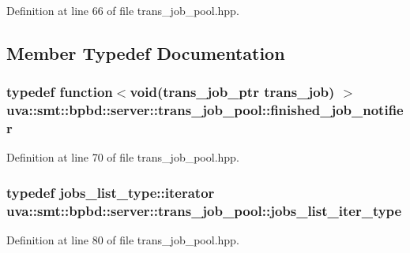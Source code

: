 Definition at line 66 of file trans\+\_\+job\+\_\+pool.\+hpp.



\subsection{Member Typedef Documentation}
\hypertarget{classuva_1_1smt_1_1bpbd_1_1server_1_1trans__job__pool_a6a18b765d5a321e2bcc7e3be3213c06e}{}
\subsubsection[{finished\+\_\+job\+\_\+notifier}]{\setlength{\rightskip}{0pt plus 5cm}typedef function$<$void({\bf trans\+\_\+job\+\_\+ptr} {\bf trans\+\_\+job}) $>$ {\bf uva\+::smt\+::bpbd\+::server\+::trans\+\_\+job\+\_\+pool\+::finished\+\_\+job\+\_\+notifier}}\label{classuva_1_1smt_1_1bpbd_1_1server_1_1trans__job__pool_a6a18b765d5a321e2bcc7e3be3213c06e}


Definition at line 70 of file trans\+\_\+job\+\_\+pool.\+hpp.

\hypertarget{classuva_1_1smt_1_1bpbd_1_1server_1_1trans__job__pool_a425f33ff0864b19e0ba351c17036d823}{}
\subsubsection[{jobs\+\_\+list\+\_\+iter\+\_\+type}]{\setlength{\rightskip}{0pt plus 5cm}typedef jobs\+\_\+list\+\_\+type\+::iterator {\bf uva\+::smt\+::bpbd\+::server\+::trans\+\_\+job\+\_\+pool\+::jobs\+\_\+list\+\_\+iter\+\_\+type}}\label{classuva_1_1smt_1_1bpbd_1_1server_1_1trans__job__pool_a425f33ff0864b19e0ba351c17036d823}


Definition at line 80 of file trans\+\_\+job\+\_\+pool.\+hpp.

